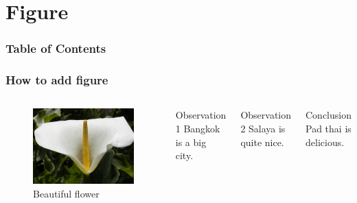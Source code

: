 \documentclass{beamer}
\theoremstyle{plain}
\begin{document}
\section{Figure}
\begin{frame}
\frametitle{Table of Contents}
\tableofcontents[currentsection]
\end{frame}


\begin{frame}
\frametitle{How to add figure}

\begin{columns}
\begin{figure}
\includegraphics[scale=0.4]{Flower}
\caption{Beautiful flower}
\end{figure}

\pause

\begin{block}{Observation 1}
Bangkok is a big city.
\end{block}

\pause

\begin{block}{Observation 2}
Salaya is quite nice.
\end{block}

\pause

\begin{block}{Conclusion}
Pad thai is delicious.
\end{block}

\end{columns}
\end{frame}
\end{document}
